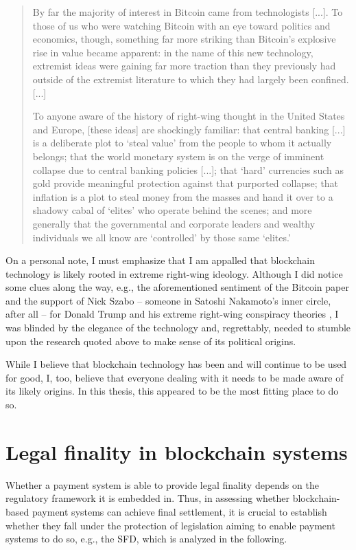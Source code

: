 \begin{quote}
	By far the majority of interest in Bitcoin came from technologists [...].
	To those of us who were watching Bitcoin with an eye toward politics and economics, though, something far more striking than Bitcoin’s explosive rise in value became apparent:
	in the name of this new technology, extremist ideas were gaining far more traction than they previously had outside of the extremist literature to which they had largely been confined. [...]

	To anyone aware of the history of right-wing thought in the United States and Europe, [these ideas] are shockingly familiar:
	that central banking [...] is a deliberate plot to `steal value' from the people to whom it actually belongs; that the world monetary system is on the verge of imminent collapse due to central banking policies [...]; that `hard' currencies such as gold provide meaningful protection against that purported collapse; that inflation is a plot to steal money from the masses and hand it over to a shadowy cabal of `elites' who operate behind the scenes; and more generally that the governmental and corporate leaders and wealthy individuals we all know are `controlled' by those same `elites.'
\end{quote}

On a personal note, I must emphasize that I am appalled that blockchain technology is likely rooted in extreme right-wing ideology.
Although I did notice some clues along the way, e.g., the aforementioned sentiment of the Bitcoin paper and the support of Nick Szabo -- someone in Satoshi Nakamoto's inner circle, after all -- for Donald Trump and his extreme right-wing conspiracy theories \autocite{twitter2020szabotrump}, I was blinded by the elegance of the technology and, regrettably, needed to stumble upon the research quoted above to make sense of its political origins.

While I believe that blockchain technology has been and will continue to be used for good, I, too, believe that everyone dealing with it needs to be made aware of its likely origins.
In this thesis, this appeared to be the most fitting place to do so.

\section{Legal finality in blockchain systems}

Whether a payment system is able to provide legal finality depends on the regulatory framework it is embedded in. %
Thus, in assessing whether blockchain-based payment systems can achieve final settlement, it is crucial to establish whether they fall under the protection of legislation aiming to enable payment systems to do so, e.g., the SFD, which is analyzed in the following.

